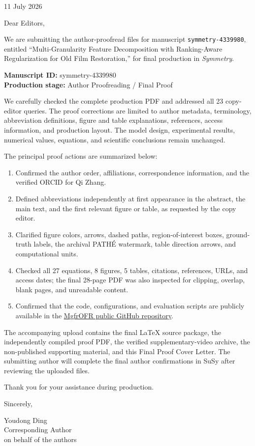 \documentclass[10.5pt,a4paper]{article}
\begin{document}
\begin{flushright}
11 July 2026
\end{flushright}

Dear Editors,

We are submitting the author-proofread files for manuscript \texttt{symmetry-4339980}, entitled ``Multi-Granularity Feature Decomposition with Ranking-Aware Regularization for Old Film Restoration,'' for final production in \emph{Symmetry}.

\textbf{Manuscript ID:} symmetry-4339980\\
\textbf{Production stage:} Author Proofreading / Final Proof

We carefully checked the complete production PDF and addressed all 23 copy-editor queries. The proof corrections are limited to author metadata, terminology, abbreviation definitions, figure and table explanations, references, access information, and production layout. The model design, experimental results, numerical values, equations, and scientific conclusions remain unchanged.

The principal proof actions are summarized below:

\begin{enumerate}[leftmargin=1.6em,itemsep=0.15em,topsep=0.15em]
    \item Confirmed the author order, affiliations, correspondence information, and the verified ORCID for Qi Zhang.
    \item Defined abbreviations independently at first appearance in the abstract, the main text, and the first relevant figure or table, as requested by the copy editor.
    \item Clarified figure colors, arrows, dashed paths, region-of-interest boxes, ground-truth labels, the archival PATH\'{E} watermark, table direction arrows, and computational units.
    \item Checked all 27 equations, 8 figures, 5 tables, citations, references, URLs, and access dates; the final 28-page PDF was also inspected for clipping, overlap, blank pages, and unreadable content.
    \item Confirmed that the code, configurations, and evaluation scripts are publicly available in the \href{https://github.com/wscffaa/MgfrOFR}{MgfrOFR public GitHub repository}.
\end{enumerate}

The accompanying upload contains the final LaTeX source package, the independently compiled proof PDF, the verified supplementary-video archive, the non-published supporting material, and this Final Proof Cover Letter. The submitting author will complete the final author confirmations in SuSy after reviewing the uploaded files.

Thank you for your assistance during production.

Sincerely,

Youdong Ding\\
Corresponding Author\\
on behalf of the authors
\end{document}
